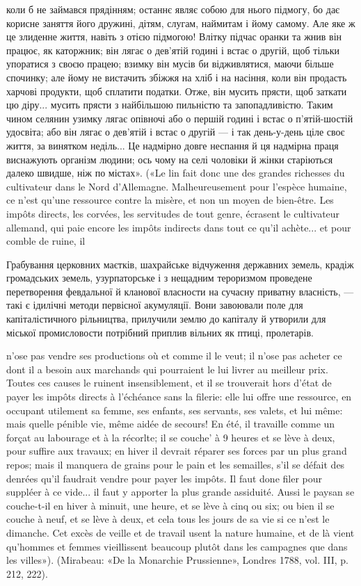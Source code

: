 {коли б не займався прядінням; останнє являє собою для нього підмогу,
бо дає корисне заняття його дружині, дітям, слугам, наймитам і йому
самому. Але яке ж це злиденне життя, навіть з отією підмогою! Влітку
підчас оранки та жнив він працює, як каторжник; він лягає о дев’ятій
годині і встає о другій, щоб тільки упоратися з своєю працею; взимку
він мусів би відживлятися, маючи більше спочинку; але йому не вистачить
збіжжя на хліб і на насіння, коли він продасть харчові продукти,
щоб сплатити податки. Отже, він мусить прясти, щоб заткати цю діру...
мусить прясти з найбільшою пильністю та запопадливістю. Таким чином
селянин узимку лягає опівночі або о першій годині і встає о п’ятій-шостій
удосвіта; або він лягає о дев’ятій і встає о другій — і так день-у-день
ціле своє життя, за винятком неділь... Це надмірно довге неспання й ця
надмірна праця виснажують організм людини; ось чому на селі чоловіки
й жінки старіються далеко швидше, ніж по містах». («Le lin fait donc
une des grandes richesses du cultivateur dans le Nord d’Allemagne. Malheureusement
pour l’espèce humaine, ce n’est qu’une ressource contre la
misère, et non un moyen de bien-être. Les impôts directs, les corvées, les
servitudes de tout genre, écrasent le cultivateur allemand, qui paie encore
les impôts indirects dans tout ce qu’il achète... et pour comble de ruine, il
}

Грабування церковних маєтків, шахрайське відчуження державних
земель, крадіж громадських земель, узурпаторське і з
нещадним тероризмом проведене перетворення февдальної й
кланової власности на сучасну приватну власність, — такі є
ідилічні методи первісної акумуляції. Вони завоювали поле
для капіталістичного рільництва, прилучили землю до капіталу
й утворили для міської промисловости потрібний приплив вільних
як птиці, пролетарів.

n’ose pas vendre ses productions où et comme il le veut; il n’ose pas acheter
ce dont il a besoin aux marchands qui pourraient le lui livrer au meilleur
prix. Toutes ces causes le ruinent insensiblement, et il se trouverait hors
d'état de payer les impôts directs à l’échéance sans la filerie: elle lui offre
une ressource, en occupant utilement sa femme, ses enfants, ses servants, ses valets,
et lui même: mais quelle pénible vie, même aidée de secours! En été, il
travaille comme un forçat au labourage et à la récorlte; il se couche’ à
9 heures et se lève à deux, pour suffire aux travaux; en hiver il devrait réparer
ses forces par un plus grand repos; mais il manquera de grains pour le
pain et les semailles, s’il se défait des denrées qu’il faudrait vendre pour payer
les impôts. Il faut done filer pour suppléer à ce vide... il faut y apporter
la plus grande assiduité. Aussi le paysan se couche-t-il en hiver à
minuit, une heure, et se lève à cinq ou six; ou bien il se couche à neuf, et
se lève à deux, et cela tous les jours de sa vie si ce n’est le dimanche. Cet
excès de veille et de travail usent la nature humaine, et de là vient qu’hommes
et femmes vieillissent beaucoup plutôt dans les campagnes que dans
les villes»). (Mirabeau: «De la Monarchie Prussienne», Londres 1788,
vol. III, p. 212, 222).

